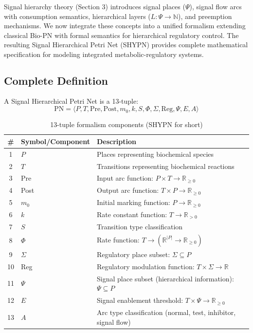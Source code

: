 
Signal hierarchy theory (Section 3) introduces signal places ($\Psi$), signal flow arcs with consumption semantics, hierarchical layers ($L: \Psi \to \mathbb{N}$), and preemption mechanisms. We now integrate these concepts into a unified formalism extending classical Bio-PN with formal semantics for hierarchical regulatory control. The resulting Signal Hierarchical Petri Net (SHYPN) provides complete mathematical specification for modeling integrated metabolic-regulatory systems.

\subsection{Complete Definition}

\begin{definition}
A Signal Hierarchical Petri Net is a 13-tuple:
\begin{equation}
\label{eq:shypn_tuple}
\text{PN} = \langle P, T, \text{Pre}, \text{Post}, m_0, k, S, \Phi, \Sigma, \text{Reg}, \Psi, E, A \rangle
\end{equation}
\end{definition}

\begin{table}[h]
\caption{13-tuple formalism components (SHYPN for short)}
\label{tab:thirteen_tuple}
\centering
\small
\begin{tabular}{@{}clp{6.5cm}@{}}
\toprule
\# & \textbf{Symbol/Component} & \textbf{Description} \\
\midrule
1 & $P$ & Places representing biochemical species \\
2 & $T$ & Transitions representing biochemical reactions \\
3 & Pre & Input arc function: $P \times T \to \mathbb{R}_{\geq 0}$ \\
4 & Post & Output arc function: $T \times P \to \mathbb{R}_{\geq 0}$ \\
5 & $m_0$ & Initial marking function: $P \to \mathbb{R}_{\geq 0}$ \\
6 & $k$ & Rate constant function: $T \to \mathbb{R}_{> 0}$ \\
7 & $S$ & Transition type classification \\
8 & $\Phi$ & Rate function: $T \to (\mathbb{R}^{|P|} \to \mathbb{R}_{\geq 0})$ \\
9 & $\Sigma$ & Regulatory place subset: $\Sigma \subseteq P$ \\
10 & Reg & Regulatory modulation function: $T \times \Sigma \to \mathbb{R}$ \\
11 & $\Psi$ & Signal place subset (hierarchical information): $\Psi \subseteq P$ \\
12 & $E$ & Signal enablement threshold: $T \times \Psi \to \mathbb{R}_{\geq 0}$ \\
13 & $A$ & Arc type classification (normal, test, inhibitor, signal flow) \\
\bottomrule
\end{tabular}
\end{table}

